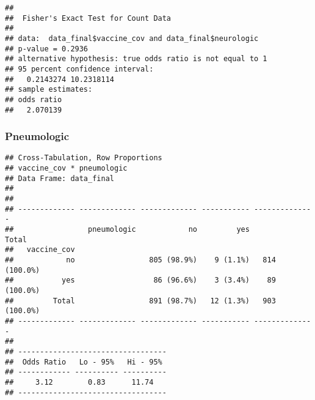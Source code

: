 \documentclass[
]{article}
\newenvironment{Shaded}{\begin{snugshade}}{\end{snugshade}}
\newcommand{\AttributeTok}[1]{\textcolor[rgb]{0.77,0.63,0.00}{#1}}
\newcommand{\ConstantTok}[1]{\textcolor[rgb]{0.00,0.00,0.00}{#1}}
\newcommand{\FunctionTok}[1]{\textcolor[rgb]{0.00,0.00,0.00}{#1}}
\newcommand{\NormalTok}[1]{#1}
\newcommand{\SpecialCharTok}[1]{\textcolor[rgb]{0.00,0.00,0.00}{#1}}
\newcommand{\StringTok}[1]{\textcolor[rgb]{0.31,0.60,0.02}{#1}}
\begin{document}
\begin{Shaded}
\end{Shaded}

\begin{verbatim}
## 
##  Fisher's Exact Test for Count Data
## 
## data:  data_final$vaccine_cov and data_final$neurologic
## p-value = 0.2936
## alternative hypothesis: true odds ratio is not equal to 1
## 95 percent confidence interval:
##   0.2143274 10.2318114
## sample estimates:
## odds ratio 
##   2.070139
\end{verbatim}

\hypertarget{pneumologic}{%
\subsubsection{Pneumologic}\label{pneumologic}}

\begin{Shaded}
\end{Shaded}

\begin{verbatim}
## Cross-Tabulation, Row Proportions  
## vaccine_cov * pneumologic  
## Data Frame: data_final  
## 
## 
## ------------- ------------- ------------- ----------- --------------
##                 pneumologic            no         yes          Total
##   vaccine_cov                                                       
##            no                 805 (98.9%)    9 (1.1%)   814 (100.0%)
##           yes                  86 (96.6%)    3 (3.4%)    89 (100.0%)
##         Total                 891 (98.7%)   12 (1.3%)   903 (100.0%)
## ------------- ------------- ------------- ----------- --------------
## 
## ----------------------------------
##  Odds Ratio   Lo - 95%   Hi - 95% 
## ------------ ---------- ----------
##     3.12        0.83      11.74   
## ----------------------------------
\end{verbatim}
\end{document}
